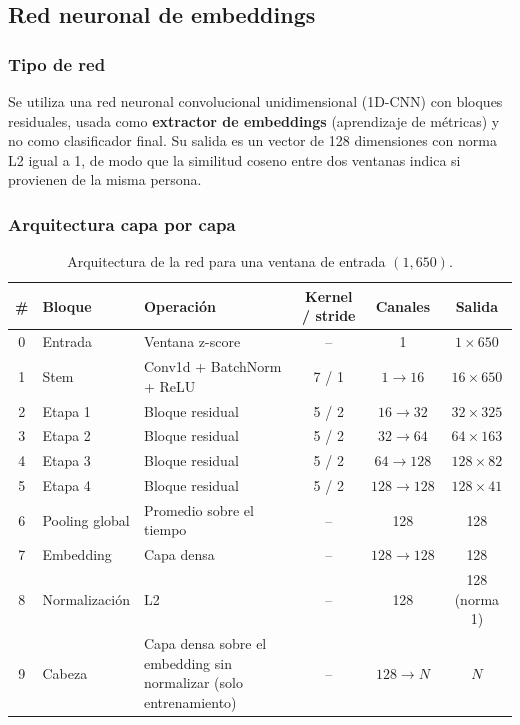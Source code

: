 \subsection{Red neuronal de embeddings}

\subsubsection{Tipo de red}

Se utiliza una red neuronal convolucional unidimensional (1D-CNN) con bloques residuales, usada como \textbf{extractor de embeddings} (aprendizaje de métricas) y no como clasificador final. Su salida es un vector de 128 dimensiones con norma L2 igual a 1, de modo que la similitud coseno entre dos ventanas indica si provienen de la misma persona.

\subsubsection{Arquitectura capa por capa}

\begin{table}[htbp]
\centering
\caption{Arquitectura de la red para una ventana de entrada $(1, 650)$.}
\label{tab:arquitectura}
\small
\begin{tabularx}{\textwidth}{c l X c c c}
\toprule
\textbf{\#} & \textbf{Bloque} & \textbf{Operación} & \textbf{Kernel / stride} & \textbf{Canales} & \textbf{Salida} \\
\midrule
0 & Entrada & Ventana z-score & -- & 1 & $1 \times 650$ \\
1 & Stem & Conv1d + BatchNorm + ReLU & 7 / 1 & $1 \rightarrow 16$ & $16 \times 650$ \\
2 & Etapa 1 & Bloque residual & 5 / 2 & $16 \rightarrow 32$ & $32 \times 325$ \\
3 & Etapa 2 & Bloque residual & 5 / 2 & $32 \rightarrow 64$ & $64 \times 163$ \\
4 & Etapa 3 & Bloque residual & 5 / 2 & $64 \rightarrow 128$ & $128 \times 82$ \\
5 & Etapa 4 & Bloque residual & 5 / 2 & $128 \rightarrow 128$ & $128 \times 41$ \\
6 & Pooling global & Promedio sobre el tiempo & -- & 128 & 128 \\
7 & Embedding & Capa densa & -- & $128 \rightarrow 128$ & 128 \\
8 & Normalización & L2 & -- & 128 & 128 (norma 1) \\
9 & Cabeza & Capa densa sobre el embedding sin normalizar (solo entrenamiento) & -- & $128 \rightarrow N$ & $N$ \\
\bottomrule
\end{tabularx}
\end{table}

